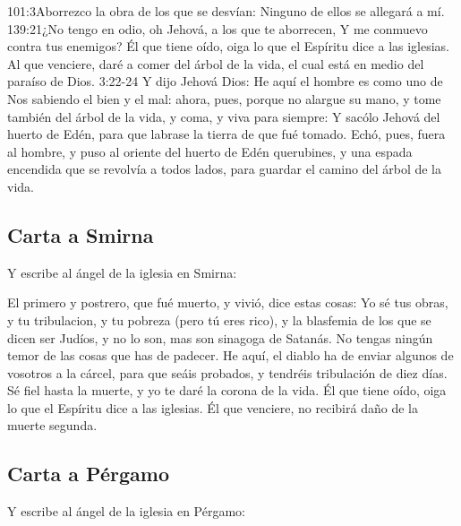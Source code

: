 			{101:3}{Aborrezco la obra de los que se desvían: Ninguno de ellos se allegará a mí.}%
			{139:21}{¿No tengo en odio, oh Jehová, a los que te aborrecen, Y me conmuevo contra tus enemigos?} %
Él que tiene oído, oiga lo que el Espíritu dice a las iglesias. Al que venciere, daré a comer del árbol de la vida, el cual está en medio del paraíso de Dios.%
				{3:22-24}{ Y dijo Jehová Dios: He aquí el hombre es como uno de Nos sabiendo el bien y el mal: ahora, pues, porque no alargue su mano, y tome también del árbol de la vida, y coma, y viva para siempre: Y sacólo Jehová del huerto de Edén, para que labrase la tierra de que fué tomado. Echó, pues, fuera al hombre, y puso al oriente del huerto de Edén querubines, y una espada encendida que se revolvía a todos lados, para guardar el camino del árbol de la vida.}
\subsection*{Carta a Smirna}
Y escribe al ángel de la iglesia en Smirna:

El primero y postrero, que fué muerto, y vivió, dice estas cosas: %
Yo sé tus obras, y tu tribulacion, y tu pobreza (pero tú eres rico), y la blasfemia de los que se dicen ser Judíos, y no lo son, mas son sinagoga de Satanás. %
No tengas ningún temor de las cosas que has de padecer. He aquí, el diablo ha de enviar algunos de vosotros a la cárcel, para que seáis probados, y tendréis tribulación de diez días.%
 Sé fiel hasta la muerte, y yo te daré la corona de la vida. %
Él que tiene oído, oiga lo que el Espíritu dice a las iglesias. Él que venciere, no recibirá daño de la muerte segunda.
\subsection*{Carta a Pérgamo}
Y escribe al ángel de la iglesia en Pérgamo:

